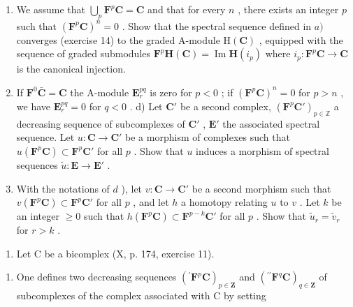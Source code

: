 \begin{enumerate}
\def\labelenumi{\alph{enumi})}
\setcounter{enumi}{1}
\item
  We assume that \(\bigcup_{p} \mathbf{F}^{p} \mathbf{C} = \mathbf{C}\) and that for every \(n\) , there exists an integer \(p\) such that \((\mathbf{F}^{p} \mathbf{C})^{n} = 0\) . Show that the spectral sequence defined in \(a)\) converges (exercise 14) to the graded A-module \(\mathrm{H}(\mathbf{C})\) , equipped with the sequence of graded submodules \(\mathbf{F}^{p} \mathbf{H}(\mathbf{C}) = \operatorname{Im} \mathbf{H}(i_{p})\) where \(i_{p}: \mathbf{F}^{p} \mathbf{C} \to \mathbf{C}\) is the canonical injection.
\item
  If \(\mathbf{F}^0\bar{\mathbf{C}} = \mathbf{C}\) the A-module \(\mathbf{E}_r^{pq}\) is zero for \(p < 0\) ; if \((\mathbf{F}^p\mathbf{C})^n = 0\) for \(p > n\) , we have \(\mathbf{E}_r^{pq} = 0\) for \(q < 0\) . d) Let \(\mathbf{C}'\) be a second complex, \((\mathbf{F}^p\mathbf{C}')_{p\in \mathbb{Z}}\) a decreasing sequence of subcomplexes of \(\mathbf{C}'\) , \(\mathbf{E}'\) the associated spectral sequence. Let \(u:\mathbf{C}\to \mathbf{C}'\) be a morphism of complexes such that \(u(\mathbf{F}^p\mathbf{C})\subset \mathbf{F}^p\mathbf{C}'\) for all \(p\) . Show that \(u\) induces a morphism of spectral sequences \(\tilde{u}:\mathbf{E}\to \mathbf{E}'\) .
\item
  With the notations of \(d\) ), let \(v: \mathbf{C} \to \mathbf{C}'\) be a second morphism such that \(v(\mathbf{F}^p \mathbf{C}) \subset \mathbf{F}^p \mathbf{C}'\) for all \(p\) , and let \(h\) a homotopy relating \(u\) to \(v\) . Let \(k\) be an integer \(\geqslant 0\) such that \(h(\mathbf{F}^p \mathbf{C}) \subset \mathbf{F}^{p-k} \mathbf{C}'\) for all \(p\) . Show that \(\tilde{u}_r = \tilde{v}_r\) for \(r > k\) .
\end{enumerate}

\begin{enumerate}
\def\labelenumi{\arabic{enumi})}
\setcounter{enumi}{16}
\tightlist
\item
  Let C be a bicomplex (X, p. 174, exercise 11).
\end{enumerate}

\begin{enumerate}
\def\labelenumi{\alph{enumi})}
\tightlist
\item
  One defines two decreasing sequences \(({}^{\prime}\mathbf{F}^p\mathbf{C})_{p\in \mathbf{Z}}\) and \(({}^{\prime\prime}\mathbf{F}^q\mathbf{C})_{q\in \mathbf{Z}}\) of subcomplexes of the complex associated with C by setting
\end{enumerate}

